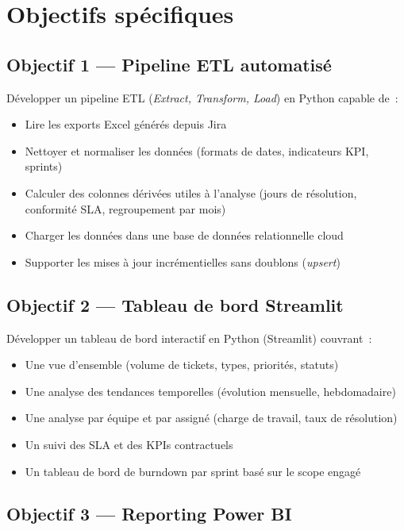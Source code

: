 \documentclass[12pt, a4paper]{report}
\begin{document}
\section{Objectifs spécifiques}

\subsection{Objectif 1 — Pipeline ETL automatisé}

Développer un pipeline ETL (\textit{Extract, Transform, Load}) en Python capable de~:
\begin{itemize}[leftmargin=2em]
    \item Lire les exports Excel générés depuis Jira
    \item Nettoyer et normaliser les données (formats de dates, indicateurs KPI, sprints)
    \item Calculer des colonnes dérivées utiles à l'analyse (jours de résolution, conformité SLA, regroupement par mois)
    \item Charger les données dans une base de données relationnelle cloud
    \item Supporter les mises à jour incrémentielles sans doublons (\textit{upsert})
\end{itemize}

\subsection{Objectif 2 — Tableau de bord Streamlit}

Développer un tableau de bord interactif en Python (Streamlit) couvrant~:
\begin{itemize}[leftmargin=2em]
    \item Une vue d'ensemble (volume de tickets, types, priorités, statuts)
    \item Une analyse des tendances temporelles (évolution mensuelle, hebdomadaire)
    \item Une analyse par équipe et par assigné (charge de travail, taux de résolution)
    \item Un suivi des SLA et des KPIs contractuels
    \item Un tableau de bord de burndown par sprint basé sur le scope engagé
\end{itemize}

\subsection{Objectif 3 — Reporting Power BI}
\end{document}
